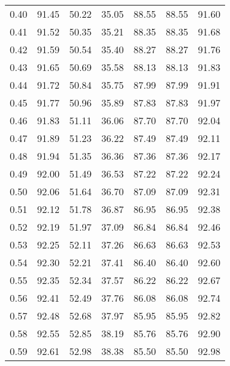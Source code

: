\begin{tabular}{|c|c|c|c|c|c|c|}
      0.40 &     91.45 &     50.22 &      35.05 &   88.55 &      88.55 &         91.60 \\
      0.41 &     91.52 &     50.35 &      35.21 &   88.35 &      88.35 &         91.68 \\
      0.42 &     91.59 &     50.54 &      35.40 &   88.27 &      88.27 &         91.76 \\
      0.43 &     91.65 &     50.69 &      35.58 &   88.13 &      88.13 &         91.83 \\
      0.44 &     91.72 &     50.84 &      35.75 &   87.99 &      87.99 &         91.91 \\
      0.45 &     91.77 &     50.96 &      35.89 &   87.83 &      87.83 &         91.97 \\
      0.46 &     91.83 &     51.11 &      36.06 &   87.70 &      87.70 &         92.04 \\
      0.47 &     91.89 &     51.23 &      36.22 &   87.49 &      87.49 &         92.11 \\
      0.48 &     91.94 &     51.35 &      36.36 &   87.36 &      87.36 &         92.17 \\
      0.49 &     92.00 &     51.49 &      36.53 &   87.22 &      87.22 &         92.24 \\
      0.50 &     92.06 &     51.64 &      36.70 &   87.09 &      87.09 &         92.31 \\
      0.51 &     92.12 &     51.78 &      36.87 &   86.95 &      86.95 &         92.38 \\
      0.52 &     92.19 &     51.97 &      37.09 &   86.84 &      86.84 &         92.46 \\
      0.53 &     92.25 &     52.11 &      37.26 &   86.63 &      86.63 &         92.53 \\
      0.54 &     92.30 &     52.21 &      37.41 &   86.40 &      86.40 &         92.60 \\
      0.55 &     92.35 &     52.34 &      37.57 &   86.22 &      86.22 &         92.67 \\
      0.56 &     92.41 &     52.49 &      37.76 &   86.08 &      86.08 &         92.74 \\
      0.57 &     92.48 &     52.68 &      37.97 &   85.95 &      85.95 &         92.82 \\
      0.58 &     92.55 &     52.85 &      38.19 &   85.76 &      85.76 &         92.90 \\
      0.59 &     92.61 &     52.98 &      38.38 &   85.50 &      85.50 &         92.98 \\

\end{tabular}
